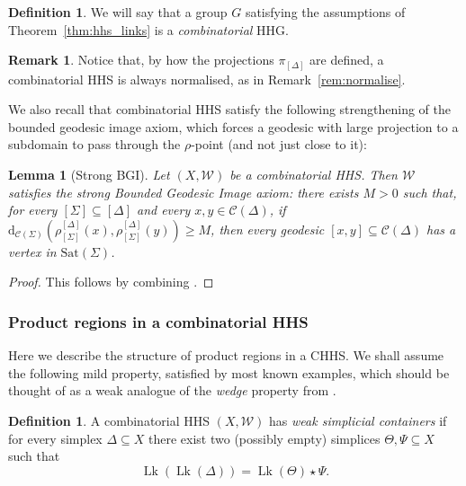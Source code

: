 \documentclass[svgnames]{amsart}
\theoremstyle{plain}
\newtheorem{lemma}[thm]{Lemma}
\theoremstyle{definition}
\newtheorem{defn}[thm]{Definition}
\newtheorem{rem}[thm]{Remark}
\newcommand{\C}{\mathcal C}
\newcommand{\dist}{\mathrm{d}}
\newcommand{\link}{\operatorname{Lk}}
\newcommand{\Sat}{\mathrm{Sat}}
\newcommand{\W}{\mathcal{W}}
\begin{document}
\begin{defn}
We will say that a group $G$ satisfying the assumptions of Theorem~\ref{thm:hhs_links} is a \emph{combinatorial} HHG.
\end{defn}

\begin{rem}
    Notice that, by how the projections $\pi_{[\Delta]}$ are defined, a combinatorial HHS is always normalised, as in Remark~\ref{rem:normalise}.
\end{rem}




We also recall that combinatorial HHS satisfy the following strengthening of the bounded geodesic image axiom, which forces a geodesic with large projection to a subdomain to pass through the $\rho$-point (and not just close to it):
\begin{lemma}[Strong BGI]\label{lem:strong_bgi}
    Let $(X,\W)$ be a combinatorial HHS. Then $\W$ satisfies the \emph{strong Bounded Geodesic Image} axiom: there exists $M>0$ such that, for every $[\Sigma]\subseteq[\Delta]$ and every $x,y\in \C(\Delta)$, if $\dist_{\C(\Sigma)}\left(\rho^{[\Delta]}_{[\Sigma]}(x),\rho^{[\Delta]}_{[\Sigma]}(y)\right)\ge M$, then every geodesic $[x,y]\subseteq\C(\Delta)$ has a vertex in $\Sat(\Sigma)$.
\end{lemma}

\begin{proof}
This follows by combining \cite[Theorem 4.9 and Lemma 5.2]{BHMS}. 
\end{proof}

\subsubsection{Product regions in a combinatorial HHS}
Here we describe the structure of product regions in a CHHS. We shall assume the following mild property, satisfied by most known examples, which should be thought of as a weak analogue of the \emph{wedge} property from \cite{BerlaiRobbio}.
\begin{defn}\label{defn:simp_cont} A combinatorial HHS $(X,\mathcal{W})$ has \emph{weak simplicial containers} if for every simplex $\Delta\subseteq X$ there exist two (possibly empty) simplices $\Theta, \Psi\subseteq X$ such that $$\link(\link(\Delta))=\link(\Theta)\star\Psi.$$
\end{defn}
\end{document}
